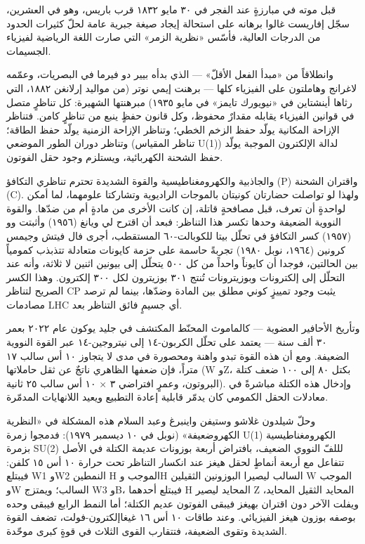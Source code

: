 \documentclass[12pt,a4paper,openany]{book}
\begin{document}



قبل موته في مبارزةٍ عند الفجر في ٣٠ مايو ١٨٣٢ قرب باريس، وهو في العشرين، سجّل إفاريست غالوا برهانه على استحالة إيجاد صيغة جبرية عامة لحلّ كثيرات الحدود من الدرجات العالية، فأسّس «نظرية الزمر» التي صارت اللغة الرياضية لفيزياء الجسيمات.


وانطلاقاً من «مبدأ الفعل الأقلّ» — الذي بدأه بيير دو فيرما في البصريات، وعمّمه لاغرانج وهاملتون على الفيزياء كلها — برهنت إيمي نوتر (من مواليد إرلانغن ١٨٨٢، التي رثاها أينشتاين في «نيويورك تايمز» في مايو ١٩٣٥) مبرهنتها الشهيرة: كل تناظرٍ متصل في قوانين الفيزياء يقابله مقدارٌ محفوظ، وكل قانون حفظٍ ينبع من تناظرٍ كامن. فتناظر الإزاحة المكانية يولّد حفظ الزخم الخطي؛ وتناظر الإزاحة الزمنية يولّد حفظ الطاقة؛ وتناظر دوران الطور الموضعي (تناظر المقياس U(1)) لدالة الإلكترون الموجبة يولّد حفظ الشحنة الكهربائية، ويستلزم وجود حقل الفوتون.


والجاذبية والكهرومغناطيسية والقوة الشديدة تحترم تناظري التكافؤ (P) واقتران الشحنة (C). ولهذا لو تواصلت حضارتان كونيتان بالموجات الراديوية وتشاركتا علومهما، لما أمكن لواحدةٍ أن تعرف، قبل مصافحةٍ قاتلة، إن كانت الأخرى من مادةٍ أم من ضدّها. والقوة النووية الضعيفة وحدها تكسر هذا التناظر: فبعد أن اقترح لي ويانغ (١٩٥٦) وأثبتت وو (١٩٥٧) كسر التكافؤ في تحلّل بيتا للكوبالت-٦٠ المستقطب، أجرى فال فيتش وجيمس كرونين (١٩٦٤، نوبل ١٩٨٠) تجربةً حاسمة على حزمة كايونات متعادلة تتذبذب كمومياً بين الحالتين، فوجدا أن كايوناً واحداً من كل ٥٠٠ يتحلّل إلى بيونين اثنين لا ثلاثة، وأنه عند التحلّل إلى إلكترونات وبوزيترونات تُنتج ٣٠١ بوزيترون لكل ٣٠٠ إلكترون. وهذا الكسر الصريح لتناظر CP يثبت وجود تمييزٍ كوني مطلق بين المادة وضدّها، بينما لم ترصد مصادمات LHC أي جسيمٍ فائق التناظر بعد.


وتأريخ الأحافير العضوية — كالماموث المحنّط المكتشف في جليد يوكون عام ٢٠٢٢ بعمر ٣٠ ألف سنة — يعتمد على تحلّل الكربون-١٤ إلى نيتروجين-١٤ عبر القوة النووية الضعيفة. ومع أن هذه القوة تبدو واهنة ومحصورة في مدى لا يتجاوز ١٠ أس سالب ١٧ متراً، فإن ضعفها الظاهري ناتجٌ عن ثقل حاملاتها (W وZ، بكتل ٨٠ إلى ١٠٠ ضعف كتلة البروتون، وعمرٍ افتراضي ٣ × ١٠ أس سالب ٢٥ ثانية). وإدخال هذه الكتلة مباشرةً في معادلات الحقل الكمومي كان يدمّر قابلية إعادة التطبيع ويعيد اللانهايات المدمّرة.


وحلّ شيلدون غلاشو وستيفن واينبرغ وعبد السلام هذه المشكلة في «النظرية الكهروضعيفة» (نوبل في ١٠ ديسمبر ١٩٧٩): فدمجوا زمرة U(1) الكهرومغناطيسية بزمرة SU(2) لللفّ النووي الضعيف، بافتراض أربعة بوزونات عديمة الكتلة في الأصل تتفاعل مع أربعة أنماطٍ لحقل هيغز عند انكسار التناظر تحت حرارة ١٠ أس ١٥ كلفن: فيبتلع W1 وW2 النمطين H الموجب وH السالب ليصيرا البوزونين الثقيلين W الموجب وW السالب؛ ويمتزج W3 وB، فيبتلع أحدهما H المحايد ليصير Z المحايد الثقيل المحايد، ويفلت الآخر دون اقتران بهيغز فيبقى الفوتون عديم الكتلة؛ أما النمط الرابع فيبقى وحده بوصفه بوزون هيغز الفيزيائي. وعند طاقات ١٠ أس ١٦ غيغاإلكترون-فولت، تضعف القوة الشديدة وتقوى الضعيفة، فتتقارب القوى الثلاث في قوةٍ كبرى موحّدة.
\end{document}
